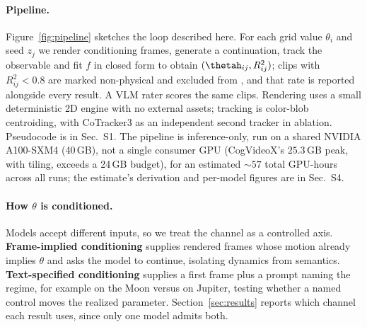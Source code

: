 \documentclass[10pt,twocolumn,letterpaper]{article}
\begin{document}
\paragraph{Pipeline.}
Figure~\ref{fig:pipeline} sketches the loop described here.
For each grid value $\theta_i$ and seed $z_j$ we render conditioning frames,
generate a continuation, track the observable and fit $f$ in closed form to
obtain $(\thetah_{ij},R^2_{ij})$; clips with $R^2_{ij}<0.8$ are marked
non-physical and excluded from \PRE, and that rate is reported alongside
every result. A VLM rater scores the same clips. Rendering uses a small
deterministic 2D engine with no external assets; tracking is color-blob
centroiding, with CoTracker3 \citep{karaev2023cotracker} as an independent
second tracker in ablation. Pseudocode is in Sec.~S1. The pipeline is
inference-only, run on a shared NVIDIA A100-SXM4 (40\,GB), not a single
consumer GPU (CogVideoX's $25.3$\,GB peak, with tiling, exceeds a 24\,GB
budget), for an estimated $\sim\!57$ total GPU-hours across all runs; the
estimate's derivation and per-model figures are in Sec.~S4.

\paragraph{How $\theta$ is conditioned.}
Models accept different inputs, so we treat the channel as a controlled axis.
\textbf{Frame-implied conditioning} supplies rendered frames whose motion
already implies $\theta$ and asks the model to continue, isolating dynamics
from semantics. \textbf{Text-specified conditioning} supplies a first frame
plus a prompt naming the regime, for example on the Moon versus on Jupiter,
testing whether a named control moves the realized parameter.
Section~\ref{sec:results} reports which channel each result uses, since only
one model admits both.
\end{document}
